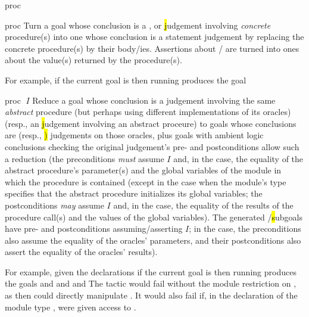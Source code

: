 \begin{tactic}{proc}
  \begin{tsyntax}{proc}
    Turn a goal whose conclusion is a \prhl, \phl or \hl judgement
    involving \emph{concrete} procedure(s) into one whose conclusion
    is a statement judgement by replacing the concrete procedure(s) by
    their body/ies. Assertions about / are turned
    into ones about the value(s) returned by the procedure(s).

  \bigskip
  For example, if the current goal is
   then
  running 
  produces the goal
  \end{tsyntax}

  \begin{tsyntax}{proc $\;I$}
    Reduce a goal whose conclusion is a \prhl judgement involving the
    same \emph{abstract} procedure (but perhaps using different
    implementations of its oracles) (resp., an \hl judgement involving
    an abstract proceure) to goals whose conclusions are \prhl (resp.,
    \hl) judgements on those oracles, plus goals with ambient logic
    conclusions checking the original judgement's pre- and
    postconditions allow such a reduction (the preconditions
    \emph{must} assume $I$ and, in the \prhl case, the equality of the
    abstract procedure's parameter(s) and the global variables of the
    module in which the procedure is contained (except in the case
    when the module's type specifies that the abstract procedure
    initializes its global variables; the postconditions \emph{may}
    assume $I$ and, in the \prhl case, the equality of the results of
    the procedure call(s) and the values of the global variables). The
    generated \prhl/\hl subgoals have pre- and postconditions
    assuming/asserting $I$; in the \prhl case, the preconditions also
    assume the equality of the oracles' parameters, and their
    postconditions also assert the equality of the oracles' results).

  \bigskip
  For example, given the declarations
  if the current goal is
   then
  running 
  produces the goals
  and
  and
  and
  The tactic would fail without the module restriction  on
  , as then  could directly manipulate .
  It would also fail if, in the declaration of the module type ,
   were given access to .
  \end{tsyntax}


\end{tactic}
